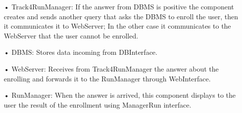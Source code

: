 \begin{enumerate}
\begin{enumerate}
\begin{enumerate}
		\item[•] Track4RunManager: If the answer from DBMS is positive the component creates and sends another query that asks the DBMS to enroll the user, then it communicates it to WebServer; In the other case it communicates to the WebServer that the user cannot be enrolled.
		\item[•] DBMS: Stores data incoming from DBInterface.
		\item[•] WebServer: Receives from Track4RunManager the answer about the enrolling and forwards it to the RunManager through WebInterface.
		\item[•] RunManager: When the answer is arrived, this component displays to the user the result of the enrollment using ManagerRun interface.
		\end{enumerate}	
	\end{enumerate}
	

\end{enumerate}
